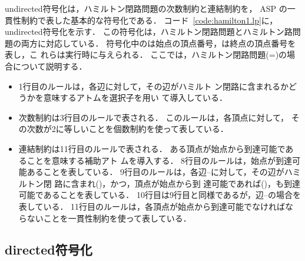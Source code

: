 

\textsf{undirected}符号化は，ハミルトン閉路問題の次数制約と連結制約を，
ASP の一貫性制約で表した基本的な符号化である．
コード~\ref{code:hamilton1.lp}に，\textsf{undirected}符号化を示す．
この符号化は，ハミルトン閉路問題とハミルトン路問題の両方に対応している．
符号化中のは始点の頂点番号，は終点の頂点番号を表し，こ
れらは実行時に与えられる．
ここでは，ハミルトン閉路問題(=)の場合について説明する．

\begin{itemize}
\item 1行目のルールは，各辺に対して，その辺がハミルト
  ン閉路に含まれるかどうかを意味するアトムを選択子を用い
  て導入している．
\item 次数制約は3行目のルールで表される．
  このルールは，各頂点に対して，
  その次数が2に等しいことを個数制約を使って表している．
\item 連結制約は11行目のルールで表される．
ある頂点が始点から到達可能であることを意味する補助アト
ムを導入する．
8行目のルールは，始点が到達可能あることを表している．
9行目のルールは，各辺--に対して，その辺がハミルトン閉
路に含まれ()，かつ，頂点が始点から到
達可能であれば()，も到達可能であることを表している．
10行目は9行目と同様であるが，辺--の場合を表している．
11行目のルールは，各頂点が始点から到達可能でなければな
らないことを一貫性制約を使って表している．
\end{itemize}

\subsection{\textsf{directed}符号化}



